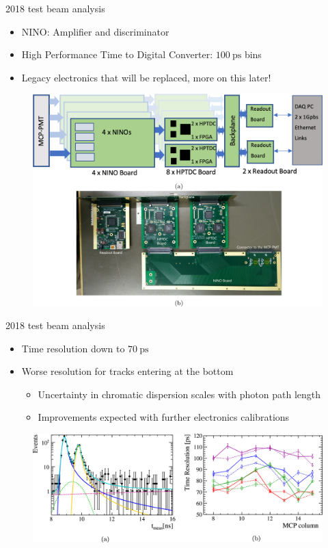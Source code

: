 \documentclass[xcolor={dvipsnames}]{beamer}
\begin{document}
\begin{frame}{2018 test beam analysis}
  \begin{itemize}
    \setlength\itemsep{1.0em}
    \item{NINO: Amplifier and discriminator}
    \item{High Performance Time to Digital Converter: $\SI{100}{\pico\second}$ bins}
    \item{Legacy electronics that will be replaced, more on this later!}
  \end{itemize}
  \begin{figure}
    \centering
    \includegraphics[width = 1.0\textwidth,trim={0 0.3cm 0 4.2cm},clip=true]{Figs/TORCH_testbeam_2018_electronics.jpg}
  \end{figure}
\end{frame}

\begin{frame}{2018 test beam analysis}
  \begin{itemize}
    \setlength\itemsep{1.0em}
    \item{Time resolution down to $\SI{70}{\pico\second}$}
    \item{Worse resolution for tracks entering at the bottom}
    \begin{itemize}
      \item{Uncertainty in chromatic dispersion scales with photon path length}
      \item{Improvements expected with further electronics calibrations}
    \end{itemize}
  \end{itemize}
  \begin{figure}
    \centering
    \includegraphics[width = 1.0\textwidth]{Figs/TORCH_testbeam_2018_TimeResolution.jpg}
  \end{figure}
\end{frame}
\end{document}
